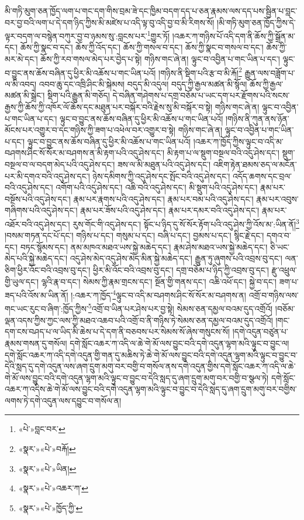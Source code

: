 མི་གཏི་མུག་ཅན་ཁྱོད་ལག་པ་གང་དག་གིས་བྲམ་ཟེ་དང་ཁྱིམ་བདག་དད་པ་ཅན་རྣམས་ལས་དད་པས་སྦྱིན་པ་བླང་བར་བྱ་བའི་ལག་པ་དེ་དག་ཉིད་ཀྱིས་མི་མཛེས་པ་འདི་ལྟ་བུ་འདི་བྱ་བ་མི་རིགས་སོ། །མི་གཏི་མུག་ཅན་ཁྱོད་ཀྱིས་དེ་ལྟར་བདག་ལ་བསྙེན་བཀུར་བྱ་བ་ཉམས་སུ་:བླངས་པར་\footnote{«པེ་»བླང་བར་}གྱུར་ཏོ། །འཆར་ཀ་གཉིས་པོ་འདི་དག་ནི་ཆོས་ཀྱི་སྒྲོན་མ་དང་། ཆོས་ཀྱི་སྣང་བ་དང་། ཆོས་ཀྱི་འོད་དང་། ཆོས་ཀྱི་གསལ་བ་དང་། ཆོས་ཀྱི་སྣང་བ་གསལ་བ་དང་། ཆོས་ཀྱི་མར་མེ་དང་། ཆོས་ཀྱི་རབ་གསལ་མེད་པར་བྱེད་པ་སྟེ། གཉིས་གང་ཞེ་ན། ལྟུང་བ་འབྱིན་པ་གང་ཡིན་པ་དང་། ལྟུང་བ་བྱུང་ནས་ཆོས་བཞིན་དུ་ཕྱིར་མི་འཆོས་པ་གང་ཡིན་པའོ། །གཉིས་ནི་སྡིག་པའི་རྩ་བ་མི་རྐོ།\footnote{«སྣར་»«པེ་»བརྐོ།} རྒྱུན་ལས་བཟློག་པ་ལ་མི་འབད། འབབ་ཆུ་དང་འཁྲི་ཤིང་མི་སྐེམས། བདུད་མི་འདུལ། བདུད་ཀྱི་རྒྱལ་མཚན་མི་སྙོལ། ཆོས་ཀྱི་རྒྱལ་མཚན་མི་སྒྲེང་། སྡིག་པའི་རྒྱུན་མི་གཅོད། དེ་བཞིན་གཤེགས་པ་དགྲ་བཅོམ་པ་ཡང་དག་པར་རྫོགས་པའི་སངས་རྒྱས་ཀྱི་ཆོས་ཀྱི་འཁོར་ལོ་ཆོས་དང་མཐུན་པར་བསྐོར་བའི་རྗེས་སུ་མི་བསྐོར་བ་སྟེ། གཉིས་གང་ཞེ་ན། ལྟུང་བ་འབྱིན་པ་གང་ཡིན་པ་དང་། ལྟུང་བ་བྱུང་ནས་ཆོས་བཞིན་དུ་ཕྱིར་མི་འཆོས་པ་གང་ཡིན་པའོ། །གཉིས་ནི་ཀུན་ནས་ཉོན་མོངས་པར་འགྱུར་བ་དང་གཉིས་ཀྱི་ཟག་པ་འཕེལ་བར་འགྱུར་བ་སྟེ། གཉིས་གང་ཞེ་ན། ལྟུང་བ་འབྱིན་པ་གང་ཡིན་པ་དང་། ལྟུང་བ་བྱུང་ནས་ཆོས་བཞིན་དུ་ཕྱིར་མི་འཆོས་པ་གང་ཡིན་པའོ། །འཆར་ཀ་ཁྱོད་ཀྱིས་ལྟུང་བ་འདི་མ་བཤགས་ཤིང་སོ་སོར་མ་བཤགས་ན་མི་རྟག་པའི་འདུ་ཤེས་དང་། མི་རྟག་པ་ལ་སྡུག་བསྔལ་བའི་འདུ་ཤེས་དང་། སྡུག་བསྔལ་བ་ལ་བདག་མེད་པའི་འདུ་ཤེས་དང་། ཟས་ལ་མི་མཐུན་པའི་འདུ་ཤེས་དང་། འཇིག་རྟེན་ཐམས་ཅད་ལ་མངོན་པར་མི་དགའ་བའི་འདུ་ཤེས་དང་། ཉེས་དམིགས་ཀྱི་འདུ་ཤེས་དང་སྤོང་བའི་འདུ་ཤེས་དང་། འདོད་ཆགས་དང་བྲལ་བའི་འདུ་ཤེས་དང་། འགོག་པའི་འདུ་ཤེས་དང་། འཆི་བའི་འདུ་ཤེས་དང་། མི་སྡུག་པའི་འདུ་ཤེས་དང་། རྣམ་པར་བསྔོས་པའི་འདུ་ཤེས་དང་། རྣམ་པར་རྣགས་པའི་འདུ་ཤེས་དང་། རྣམ་པར་བམ་པའི་འདུ་ཤེས་དང་། རྣམ་པར་འབུས་གཞིགས་པའི་འདུ་ཤེས་དང་། རྣམ་པར་ཟོས་པའི་འདུ་ཤེས་དང་། རྣམ་པར་དམར་བའི་འདུ་ཤེས་དང་། རྣམ་པར་འཐོར་བའི་འདུ་ཤེས་དང་། རུས་གོང་གི་འདུ་ཤེས་དང་། སྟོང་པ་ཉིད་དུ་སོ་སོར་རྟོག་པའི་འདུ་ཤེས་ཀྱི་འོས་མ་:ཡིན་ནོ།\footnote{«སྣར་»«པེ་»ཡིན།} །བསམ་གཏན་དང་པོ་དང་། གཉིས་པ་དང་། གསུམ་པ་དང་། བཞི་པ་དང་། བྱམས་པ་དང་། སྙིང་རྗེ་དང་། དགའ་བ་དང་། བཏང་སྙོམས་དང་། ནམ་མཁའ་མཐའ་ཡས་སྐྱེ་མཆེད་དང་། རྣམ་ཤེས་མཐའ་ཡས་སྐྱེ་མཆེད་དང་། ཅི་ཡང་མེད་པའི་སྐྱེ་མཆེད་དང་། འདུ་ཤེས་མེད་འདུ་ཤེས་མེད་མིན་སྐྱེ་མཆེད་དང་། རྒྱུན་ཏུ་ཞུགས་པའི་འབྲས་བུ་དང་། ལན་ཅིག་ཕྱིར་འོང་བའི་འབྲས་བུ་དང་། ཕྱིར་མི་འོང་བའི་འབྲས་བུ་དང་། དགྲ་བཅོམ་པ་ཉིད་ཀྱི་འབྲས་བུ་དང་། རྫུ་འཕྲུལ་གྱི་ཡུལ་དང་། ལྷའི་རྣ་བ་དང་། སེམས་ཀྱི་རྣམ་གྲངས་དང་། སྔོན་གྱི་གནས་དང་། འཆི་འཕོ་དང་། སྐྱེ་བ་དང་། ཟག་པ་ཟད་པའི་འོས་མ་ཡིན་ནོ། །:འཆར་ཀ་ཁྱོད་\footnote{«སྣར་»«པེ་»འཆར་ཀ་}ལྟུང་བ་འདི་མ་བཤགས་ཤིང་སོ་སོར་མ་བཤགས་ན། འགྲོ་བ་གཉིས་ལས་གང་ཡང་རུང་བ་ཞིག་:ཁྱོད་ཀྱིས་\footnote{«སྣར་»«པེ་»ཁྱོད་ཀྱི་}འགྲོ་བ་ཡིན་པར་ཤེས་པར་བྱ་སྟེ། སེམས་ཅན་དམྱལ་བའམ་དུད་འགྲོའོ། །བཅོམ་ལྡན་འདས་ཀྱིས་ཀྱང་ལས་ཀྱི་མཐའ་འཆབ་པའི་འགྲོ་བ་ནི་གཉིས་ཏེ་སེམས་ཅན་དམྱལ་བའམ་དུད་འགྲོའོ། །གང་དག་ངས་བཤད་པ་ལ་ཡིད་མི་ཆེས་པ་དེ་དག་ནི་བཅབས་པར་སེམས་སོ་ཞེས་གསུངས་སོ། །དགེ་འདུན་བཙུན་པ་རྣམས་གསན་དུ་གསོལ། དགེ་སློང་འཆར་ཀ་འདི་ལ་ཆེ་གེ་མོ་ལས་བྱུང་བའི་དགེ་འདུན་ལྷག་མའི་ལྟུང་བ་བྱུང་ལ། དགེ་སློང་འཆར་ཀ་འདི་དགེ་འདུན་གྱི་གན་དུ་མཆིས་ཏེ་ཆེ་གེ་མོ་ལས་བྱུང་བའི་དགེ་འདུན་ལྷག་མའི་ལྟུང་བ་བྱུང་བ་དེའི་སླད་དུ་དགེ་འདུན་ལས་ཞག་དྲུག་མགུ་བར་བགྱི་བ་གསོལ་ནས་དགེ་འདུན་གྱིས་དགེ་སློང་འཆར་ཀ་འདི་ལ་ཆེ་གེ་མོ་ལས་བྱུང་བའི་དགེ་འདུན་ལྷག་མའི་ལྟུང་བ་བྱུང་བ་དེའི་སླད་དུ་ཞག་དྲུག་མགུ་བར་བགྱི་བ་སྩལ་ཏེ། དགེ་སློང་འཆར་ཀ་འདིས་ཆེ་གེ་མོ་ལས་བྱུང་བའི་དགེ་འདུན་ལྷག་མའི་ལྟུང་བ་བྱུང་བ་དེའི་སླད་དུ་ཞག་དྲུག་མགུ་བར་བགྱིས་ལགས་ཏེ་དགེ་འདུན་ལས་དབྱུང་བ་གསོལ་ན། 